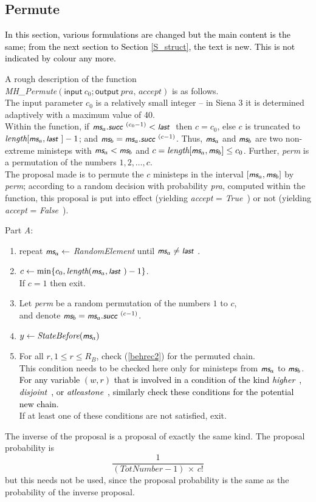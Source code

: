 \documentclass[a4paper,12pt,fleqn]{article}
\newcommand{\ttimes}{\,\times\,}
\newcommand{\nnm}[1]{\textsf{\small\textit{#1}\ }}
\newcommand{\ms}{\textsl{\textsf{\small ms}}} %
\newcommand{\addaa}[1]{{\textcolor[named]{Black}{#1}}}  %
\newcommand{\addce}[1]{{\textcolor[named]{Black}{#1}}}
\begin{document}
\subsection{Permute}
\addaa{In this section, various formulations are changed but the main content is the same;
from the next section to Section \ref{S_struct}, the text is new.
This is not indicated by colour any more.}

A rough description of the function\\
\textit{MH\_Permute}$(\textsf{input}\ c_0; \textsf{output}\ \textit{pra, accept})$
is as follows.\\
The input parameter $c_0$ is a relatively small integer --
in Siena 3 it is determined adaptively with a maximum value of 40. \\
Within the function,
if $\ms_a.\nnm{succ}^{(c_0-1)} < \nnm{last}$
then $c = c_0$, else $c$ is truncated to $\textit{length}[\ms_a, \nnm{last}]-1$;
and $\ms_b = \ms_a.\nnm{succ}^{(c-1)}$.
Thus, $\ms_a$ and $\ms_b$ are two non-extreme ministeps with  $\ms_a < \ms_b$
and $c = \textit{length}[\ms_a, \ms_b] \leq c_0$.
Further, \textit{perm} is a permutation of the numbers
$1, 2, \ldots, c$.\\
The proposal made is to permute the $c$ ministeps in the interval $[\ms_a, \ms_b] $
by \textit{perm};
according to a random decision with probability \textit{pra},
computed within the function,
this proposal is put into effect (yielding \textit{accept} = \nnm{True})
or not (yielding \textit{accept} = \nnm{False}).


Part \emph{A}:
\begin{enumerate}
\item repeat $\ms_a \leftarrow $ \textit{RandomElement} until $\ms_a \neq \nnm{last}$.
\item $c \leftarrow \min \{c_0, \textit{length}(\ms_a, \nnm{last}) - 1\}$.\\
      If $c = 1$ then exit.
\item Let \textit{perm} be a random permutation of the numbers $1$ to $c$,\\
      and denote $\ms_b = \ms_a.\nnm{succ}^{(c-1)}$.
\item $y \leftarrow  \textit{StateBefore}(\ms_a)$
\item For all $r, 1 \leq r \leq R_B$, check (\ref{behrec2}) for the permuted chain. \\
      This condition needs to be checked
      here only for ministeps from $\ms_a$ to $\ms_b$.\\
\addce{ For any variable $(w,r)$ that is involved in a condition of the kind
      \nnm{higher}, \nnm{disjoint}, or \nnm{atleastone},  similarly check these conditions
      for the potential new chain.}\\
      If at least one of these conditions are not satisfied, exit.
\end{enumerate}
The inverse of the proposal is a proposal of exactly the same kind. The
proposal probability is
\[
   \frac1{(\textit{TotNumber}-1) \ttimes c!}
\]
but this needs not be used, since the proposal probability is the same as the
probability of the inverse proposal.
\end{document}
